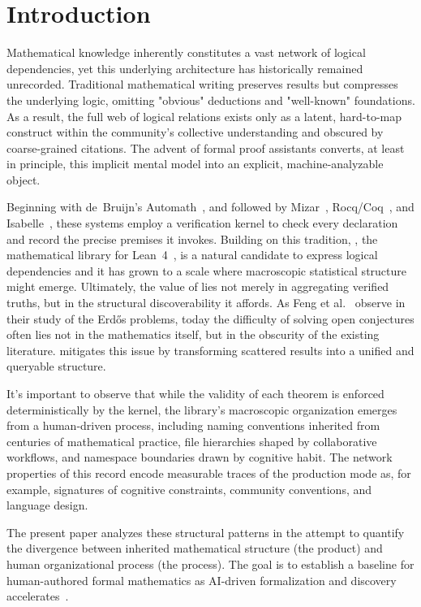 \section{Introduction}

Mathematical knowledge inherently constitutes a vast network of logical dependencies, yet this underlying architecture has historically remained unrecorded. Traditional mathematical writing preserves results but compresses the underlying logic, omitting "obvious" deductions and "well-known" foundations. As a result, the full web of logical relations exists only as a latent, hard-to-map construct within the community's collective understanding and obscured by coarse-grained citations. The advent of formal proof assistants converts, at least in principle, this implicit mental model into an explicit, machine-analyzable object.

Beginning with de~Bruijn's Automath~\cite{debruijn1970}, and followed by Mizar~\cite{trybulec1978}, Rocq/Coq~\cite{coquand1988}, and Isabelle~\cite{paulson1994}, these systems employ a verification kernel to check every declaration and record the precise premises it invokes. Building on this tradition, , the mathematical library for Lean~4~\cite{mathlib2020,lean4}, is a natural candidate to express logical dependencies and it has grown to a scale where macroscopic statistical structure might emerge.
Ultimately, the value of  lies not merely in aggregating verified truths, but in the structural discoverability it affords. As Feng et al.~\cite{feng2026erdos} observe in their study of the Erd\H{o}s problems, today the difficulty of solving open conjectures often lies not in the mathematics itself, but in the obscurity of the existing literature.  mitigates this issue by transforming scattered results into a unified and queryable structure.


It's important to observe that while the validity of each theorem is enforced deterministically by the kernel, the library's macroscopic organization emerges from a human-driven process, including naming conventions inherited from centuries of mathematical practice, file hierarchies shaped by collaborative workflows, and namespace boundaries drawn by cognitive habit. The network properties of this record encode measurable traces of the production mode as, for example, signatures of cognitive constraints, community conventions, and language design. 

The present paper analyzes these structural patterns in the attempt to quantify the divergence between inherited mathematical structure (the product) and human organizational process (the process). The goal is to  establish a baseline for human-authored formal mathematics as AI-driven formalization and discovery accelerates~\cite{hubert2025alphaproof,achim2025aristotle,chen2025seedprover,xin2025deepseekprover}.

